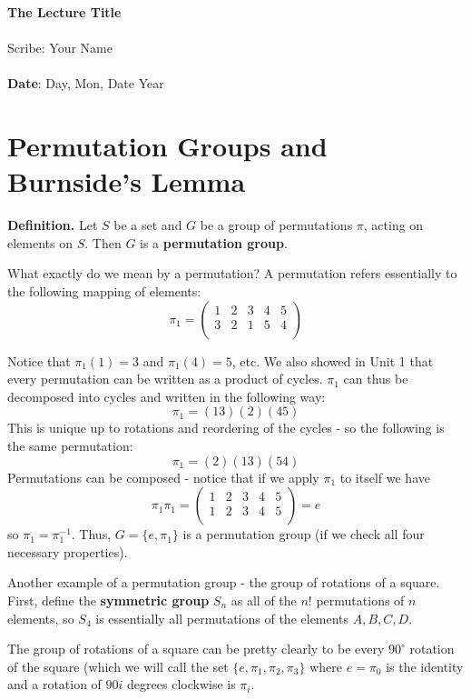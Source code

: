 \documentclass[11pt,twosided]{article}
\def\titlestring{The Lecture Title}
\def\scribestring{Your Name}
\def\datestring{Day, Mon, Date Year}
\begin{document}
\thispagestyle{plain}  %

\noindent
{\LARGE \textbf{\titlestring}}\\\\
%
{\Large Scribe: \scribestring}\\ \\
{\textbf{Date}: \datestring}


\noindent

\section{Permutation Groups and Burnside's Lemma}
\textbf{Definition.} Let $S$ be a set and $G$ be a group of permutations $\pi$, acting on elements on $S$. Then $G$ is a \textbf{permutation group}. 

What exactly do we mean by a permutation? A permutation refers essentially to the following mapping of elements: 
\[
\pi_1 = 
\begin{pmatrix}
1 & 2 & 3 & 4 & 5 \\
3 & 2 & 1 & 5 & 4 \\
\end{pmatrix}
\]

Notice that $\pi_1(1) = 3$ and $\pi_1(4) = 5$, etc. 
We also showed in Unit 1 that every permutation can be written as a product of cycles. $\pi_1$ can thus be decomposed into cycles and written in the following way: 
\[
	\pi_1 = (13) (2) (45)
\]
This is unique up to rotations and reordering of the cycles - so the following is the same permutation: 
\[
	\pi_1 = (2) (1 3)(54)
\]
Permutations can be composed - notice that if we apply $\pi_1$ to itself we have
\[
	\pi_1 \pi_1 = \begin{pmatrix}
1 & 2 & 3 & 4 & 5 \\
1 & 2 & 3 & 4 & 5 \\
\end{pmatrix} = e
\]	
so $\pi_1 = \pi_1^{-1}$. Thus, $G = \{ e, \pi_1\}$ is a permutation group (if we check all four necessary properties). 

Another example of a permutation group - the group of rotations of a square. First, define the \textbf{symmetric group} $S_n$ as all of the $n!$ permutations of $n$ elements, so $S_4$ is essentially all permutations of the elements $A, B, C, D$. 

The group of rotations of a square can be pretty clearly to be every $90^\circ$ rotation of the square (which we will call the set $\{ e, \pi_1, \pi_2, \pi_3 \}$ where $e = \pi_0$ is the identity and a rotation of $90i$ degrees clockwise is $\pi_i$.
\end{document}

